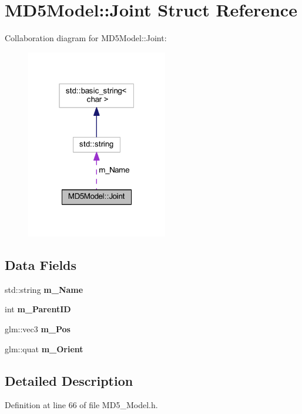 \hypertarget{struct_m_d5_model_1_1_joint}{}\section{M\+D5\+Model\+:\+:Joint Struct Reference}
\label{struct_m_d5_model_1_1_joint}


Collaboration diagram for M\+D5\+Model\+:\+:Joint\+:
\nopagebreak
\begin{figure}[H]
\begin{center}
\leavevmode
\includegraphics[width=175pt]{struct_m_d5_model_1_1_joint__coll__graph}
\end{center}
\end{figure}
\subsection*{Data Fields}
\begin{DoxyCompactItemize}
\item 
std\+::string {\bfseries m\+\_\+\+Name}\hypertarget{struct_m_d5_model_1_1_joint_a87fc950b11a52a0f5c3ac5ef8ec554ac}{}\label{struct_m_d5_model_1_1_joint_a87fc950b11a52a0f5c3ac5ef8ec554ac}

\item 
int {\bfseries m\+\_\+\+Parent\+ID}\hypertarget{struct_m_d5_model_1_1_joint_a386ca25e937f6341eb8a2afd1d2165e8}{}\label{struct_m_d5_model_1_1_joint_a386ca25e937f6341eb8a2afd1d2165e8}

\item 
glm\+::vec3 {\bfseries m\+\_\+\+Pos}\hypertarget{struct_m_d5_model_1_1_joint_ad0858a102b54299e5fe8ad942acffea0}{}\label{struct_m_d5_model_1_1_joint_ad0858a102b54299e5fe8ad942acffea0}

\item 
glm\+::quat {\bfseries m\+\_\+\+Orient}\hypertarget{struct_m_d5_model_1_1_joint_a9fbf36372259c5d1c877b06c991c279b}{}\label{struct_m_d5_model_1_1_joint_a9fbf36372259c5d1c877b06c991c279b}

\end{DoxyCompactItemize}


\subsection{Detailed Description}


Definition at line 66 of file M\+D5\+\_\+\+Model.\+h.

